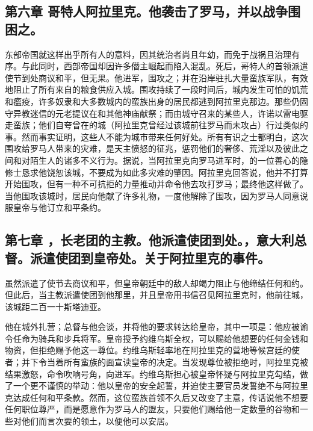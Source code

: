 
\subsection{第六章 哥特人阿拉里克。他袭击了罗马，并以战争围困之。}

东部帝国就这样出乎所有人的意料，因其统治者尚且年幼，而免于战祸且治理有序。与此同时，西部帝国却因许多僭主崛起而陷入混乱。死后，哥特人的首领派遣使节到处商议和平，但无果。他进军，围攻之；并在沿岸驻扎大量蛮族军队，有效地阻止了所有来自的粮食供应入城。围攻持续了一段时间后，城内发生可怕的饥荒和瘟疫，许多奴隶和大多数城内的蛮族出身的居民都逃到阿拉里克那边。那些仍固守异教迷信的元老提议在和其他神庙献祭；而由城守召来的某些人，许诺以雷电驱走蛮族；他们自夸曾在的城（阿拉里克曾经过该城前往罗马而未攻占）行过类似的事。然而事实证明，这些人不能为城市带来任何好处。所有有识之士都明白，这次围攻给罗马人带来的灾难，是天主愤怒的征兆，惩罚他们的奢侈、荒淫以及彼此之间和对陌生人的诸多不义行为。据说，当阿拉里克向罗马进军时，的一位善心的隐修士恳求他饶恕该城，不要成为如此多灾难的肇因。阿拉里克回答说，他并不打算开始围攻，但有一种不可抗拒的力量推动并命令他去攻打罗马；最终他这样做了。当他围攻该城时，居民向他献了许多礼物，一度他解除了围攻，因为罗马人同意说服皇帝与他订立和平条约。\par


\subsection{第七章 ，长老团的主教。他派遣使团到处。，意大利总督。派遣使团到皇帝处。关于阿拉里克的事件。}

虽然派遣了使节去商议和平，但皇帝朝廷中的敌人却竭力阻止与他缔结任何和约。但此后，当主教派遣使团到他那里，并且皇帝用书信召见阿拉里克时，他前往城，该城距二百一十斯塔迪亚。\par

他在城外扎营；总督与他会谈，并将他的要求转达给皇帝，其中一项是：他应被谕令任命为骑兵和步兵将军。皇帝授予约维乌斯全权，可以赐给他想要的任何金钱和物资，但拒绝赐予他这一尊位。约维乌斯轻率地在阿拉里克的营地等候宫廷的使者；并下令当着所有蛮族的面宣读皇帝的决定。当发现尊位被拒绝时，阿拉里克被结果激怒，命令吹响号角，向进军。约维乌斯担心被皇帝怀疑与阿拉里克勾结，做了一个更不谨慎的举动：他以皇帝的安全起誓，并迫使主要官员发誓绝不与阿拉里克达成任何和平条款。然而，这位蛮族首领不久后又改变了主意，传话说他不想要任何职位尊严，而是愿意作为罗马人的盟友，只要他们赐给他一定数量的谷物和一些对他们而言次要的领土，以便他可以安居。\par

